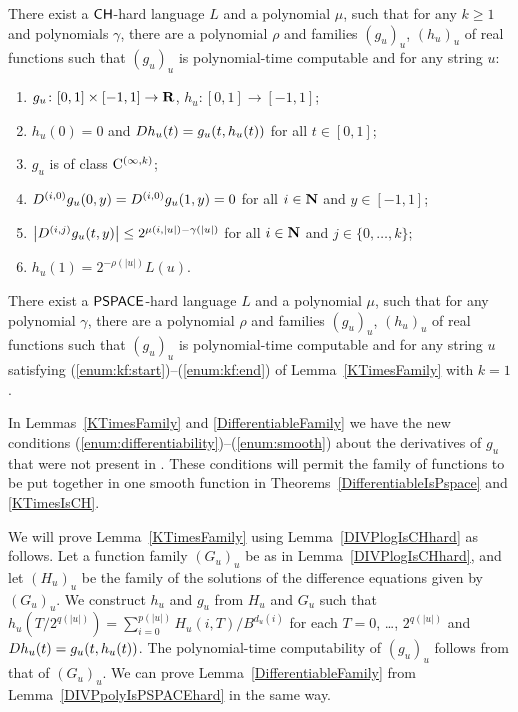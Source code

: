  \begin{lemma}
  \label{KTimesFamily}
  There exist a $\mathsf{CH}$-hard language $L$ and a polynomial $\mu$,
  such that for any $k \ge 1$ and polynomials $\gamma$,
  there are a polynomial $\rho$ and families $(g_u)_u$, $(h_u)_u$ of real functions
  such that $(g_u)_u$ is polynomial-time computable and for any string $u$:
  \begin{enumerate}
   \item \label{enum:kf:start}
	 $g_u\colon [0,1] \times [-1,1]\to \mathbf R$, $h_u\colon [0,1] \to [-1,1]$;
   \item \label{enum:equation}
	 $h_u(0) = 0$ and $D h_u(t) = g_u(t, h_u(t))$ for all $t \in [0,1]$;
   \item \label{enum:differentiability}
         $g_u$ is of class $\mathrm C^{(\infty, k)}$;
   \item \label{enum:boundary}
	 $
	 D^{(i, 0)} g_u(0,y) = D^{(i, 0)} g_u(1,y) = 0
         $ for all $i \in \mathbf N$ and $y \in [-1,1]$;
   \item \label{enum:smooth}
	 $
	 \left|D^{(i,j)} g_u(t,y)\right| \le 2^{\mu(i, |u|) - \gamma(|u|)}
         $ for all $i \in \mathbf N$ and $j \in \{0, \dots, k\}$;
   \item \label{enum:kf:end}
	 $h_u(1) = 2^{-\rho(|u|)} L(u)$.
  \end{enumerate}
 \end{lemma}

\begin{lemma}
 \label{DifferentiableFamily}
 There exist a $\mathsf{PSPACE}$-hard language $L$ and a polynomial $\mu$,
 such that for any polynomial $\gamma$,
 there are a polynomial $\rho$ and families $(g_u)_u$, $(h_u)_u$ of real functions
 such that $(g_u)_u$ is polynomial-time computable and for any string $u$
 satisfying (\ref{enum:kf:start})--(\ref{enum:kf:end}) of Lemma~\ref{KTimesFamily} with $k = 1$.
\end{lemma}

In Lemmas~\ref{KTimesFamily} and \ref{DifferentiableFamily}
we have the new conditions (\ref{enum:differentiability})--(\ref{enum:smooth})
about the derivatives of $g_u$
that were not present in \cite[Lemma 4.1]{kawamura2010lipschitz}.
These conditions will permit the family of functions to be put together in one smooth function in Theorems~\ref{DifferentiableIsPspace} and \ref{KTimesIsCH}.


We will prove Lemma~\ref{KTimesFamily} using Lemma~\ref{DIVPlogIsCHhard} as follows.
Let a function family $(G_u)_u$ be as in Lemma~\ref{DIVPlogIsCHhard},
and let $(H_u)_u$ be the family of the solutions of the difference equations given by $(G_u)_u$.
We construct $h_u$ and $g_u$ from $H_u$ and $G_u$ 
such that $h_u(T/2^{q(|u|)}) = \sum^{p(|u|)}_{i = 0} H_u(i, T)/B^{d_u(i)}$ for each $T = 0$, \ldots, $2^{q(|u|)}$
and $D h_u(t) = g_u(t, h_u(t))$.
The polynomial-time computability of $(g_u)_u$ follows from that of $(G_u)_u$.
We can prove Lemma~\ref{DifferentiableFamily} from Lemma~\ref{DIVPpolyIsPSPACEhard} in the same way.


